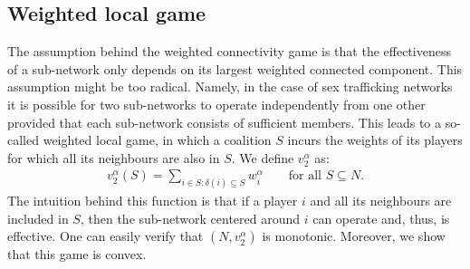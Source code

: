 \documentclass[10p]{article}
\theoremstyle{definition}
\theoremstyle{definition}
\begin{document}
\subsection{Weighted local game}
The assumption behind the weighted connectivity game is that the effectiveness of a sub-network only depends on its largest weighted connected component. This assumption might be too radical. Namely, in the case of sex trafficking networks it is possible for two sub-networks to operate independently from one other provided that each sub-network consists of sufficient members. This leads to a so-called weighted local game, in which a coalition $S$ incurs the weights of its players for which all its neighbours are also in $S$. We define $v_2^\alpha$ as:
\begin{align*}
    v_2^\alpha (S) = \sum_{i \in S : \delta(i) \subseteq S} w_i^
    \alpha \qquad \text{for all $S \subseteq N$.}
\end{align*}
The intuition behind this function is that if a player $i$ and all its neighbours are included in $S$, then the sub-network centered around $i$ can operate and, thus, is effective. One can easily verify that $(N,v_2^\alpha)$ is monotonic. Moreover, we show that this game is convex.
\end{document}
